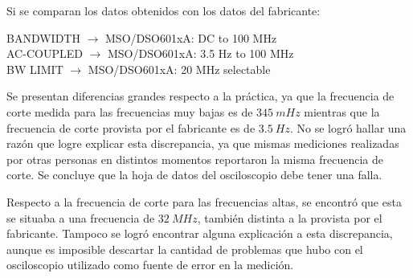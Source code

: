 \documentclass[a4paper]{article}
\begin{document}
Si se comparan los datos obtenidos con los datos del fabricante:
\begin{center}
BANDWIDTH $\rightarrow$ MSO/DSO601xA: DC to 100 MHz\\
AC-COUPLED $\rightarrow$ MSO/DSO601xA: 3.5 Hz to 100 MHz\\
BW LIMIT $\rightarrow$ MSO/DSO601xA: 20 MHz selectable\\
\end{center}

Se presentan diferencias grandes respecto a la práctica, ya que la frecuencia de corte medida para las frecuencias muy bajas es de $345 \ mHz$ mientras que la frecuencia de corte provista por el fabricante es de $3.5 \ Hz$. No se logró hallar una razón que logre explicar esta discrepancia, ya que mismas mediciones realizadas por otras personas en distintos momentos reportaron la misma frecuencia de corte. Se concluye que la hoja de datos del osciloscopio debe tener una falla.

Respecto a la frecuencia de corte para las frecuencias altas, se encontró que esta se situaba a una frecuencia de $32 \ MHz$, también distinta a la provista por el fabricante. Tampoco se logró encontrar alguna explicación a esta discrepancia, aunque es imposible descartar la cantidad de problemas que hubo con el osciloscopio utilizado como fuente de error en la medición.
\end{document}
